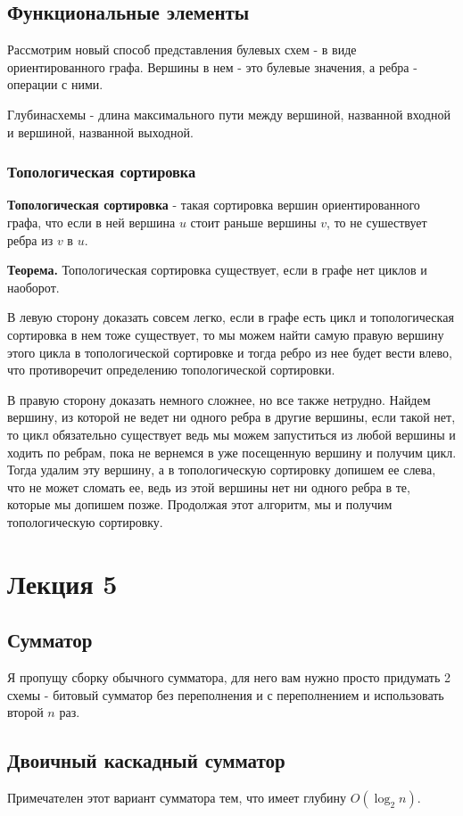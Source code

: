 \documentclass{article}
\begin{document}
\subsection{Функциональные элементы}
Рассмотрим новый способ представления булевых схем - в виде ориентированного графа. Вершины в нем - это булевые значения, а ребра - операции с ними. 

$Глубина схемы$ - длина максимального пути между вершиной, названной входной и вершиной, названной выходной. 

\subsubsection{Топологическая сортировка}
\textbf{Топологическая сортировка} - такая сортировка вершин ориентированного графа, что если в ней вершина $u$ стоит раньше вершины $v$, то не сушествует ребра из $v$ в $u$.

\textbf{Теорема.} Топологическая сортировка существует, если в графе нет циклов и наоборот.

В левую сторону доказать совсем легко, если в графе есть цикл и топологическая сортировка в нем тоже существует, то мы можем найти самую правую вершину этого цикла в топологической сортировке и тогда ребро из нее будет вести влево, что противоречит определению топологической сортировки.

В правую сторону доказать немного сложнее, но все также нетрудно. Найдем вершину, из которой не ведет ни одного ребра в другие вершины, если такой нет, то цикл обязательно существует ведь мы можем запуститься из любой вершины и ходить по ребрам, пока не вернемся в уже посещенную вершину и получим цикл. Тогда удалим эту вершину, а в топологическую сортировку допишем ее слева, что не может сломать ее, ведь из этой вершины нет ни одного ребра в те, которые мы допишем позже. Продолжая этот алгоритм, мы и получим топологическую сортировку. 

\section{Лекция 5}
\subsection{Сумматор}
Я пропущу сборку обычного сумматора, для него вам нужно просто придумать 2 схемы - битовый сумматор без переполнения и с переполнением и использовать второй $n$ раз.

\subsection{Двоичный каскадный сумматор}
Примечателен этот вариант сумматора тем, что имеет глубину $O(\log_2n)$. 
\end{document}
